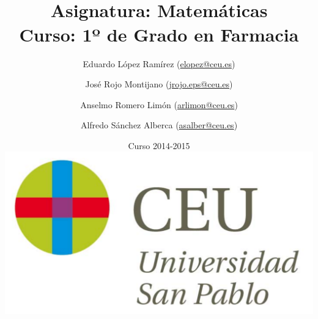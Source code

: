 \documentclass[a4paper,titlepage,dvips]{article}
\begin{document}
\sloppy

\title{\vskip 2cm
\shadowbox{\Huge \textbf{\textsf{\quad \textcolor[rgb]{0.00,0.00,0.50}{EJERCICIOS DE ESTADÍSTICA}\quad}}}\\
   \vskip 1cm
   {\Large \textsf{\textcolor[rgb]{0.50,0.00,0.25}{Asignatura: Matemáticas}}}\\
   {\Large \textsf{\textcolor[rgb]{0.50,0.00,0.25}{Curso: 1º de Grado en Farmacia}}}
   }
\author{
   Eduardo López Ramírez (\url{elopez@ceu.es})
   \and
   José Rojo Montijano (\url{jrojo.eps@ceu.es})
   \and
   Anselmo Romero Limón (\url{arlimon@ceu.es})
   \and
   Alfredo Sánchez Alberca (\url{asalber@ceu.es})
}
\date{Curso 2014-2015\\[1cm]
\includegraphics[scale=0.3]{img/logo_uspceu_01}}

\maketitle
\newpage
\tableofcontents
\newpage







\end{document}
